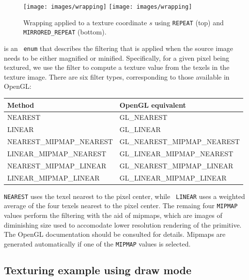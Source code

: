 \begin{figure}[h]
\begin{center}
\iflatexml
 \texttt{[image: images/wrapping]}
\else
 \texttt{[image: images/wrapping]}
\fi
\end{center}
\caption{Wrapping applied to a texture coordinate $s$
using {\tt REPEAT} (top) and {\tt MIRRORED\_REPEAT} (bottom).}
\label{wrapping:fig}
\end{figure}
%

 is an {\tt
enum} that describes the filtering that is applied when the source
image needs to be either magnified or minified. Specifically, for a
given pixel being textured, we use the filter to compute a texture
value from the texels in the texture image. There are six filter
types, corresponding to those available in OpenGL:
%
\begin{center}
\begin{tabular}{|ll|}
\hline
Method & OpenGL equivalent\\
\hline 
NEAREST & GL\_NEAREST \\
LINEAR & GL\_LINEAR \\
NEAREST\_MIPMAP\_NEAREST & GL\_NEAREST\_MIPMAP\_NEAREST \\
LINEAR\_MIPMAP\_NEAREST & GL\_LINEAR\_MIPMAP\_NEAREST \\
NEAREST\_MIPMAP\_LINEAR & GL\_NEAREST\_MIPMAP\_LINEAR \\
LINEAR\_MIPMAP\_LINEAR & GL\_LINEAR\_MIPMAP\_LINEAR \\
\hline
\end{tabular}
\end{center}
{\tt NEAREST} uses the texel nearest to the pixel center, while {\tt
LINEAR} uses a weighted average of the four texels nearest to the
pixel center. The remaing four {\tt MIPMAP} values perform the
filtering with the aid of mipmaps, which are images of diminishing
size used to accomodate lower resolution rendering of the primitive.
The OpenGL documentation should be consulted for details.  Mipmaps are
generated automatically if one of the {\tt MIPMAP} values is selected.

\subsection{Texturing example using draw mode}
\label{drawModeMapping:sec}

